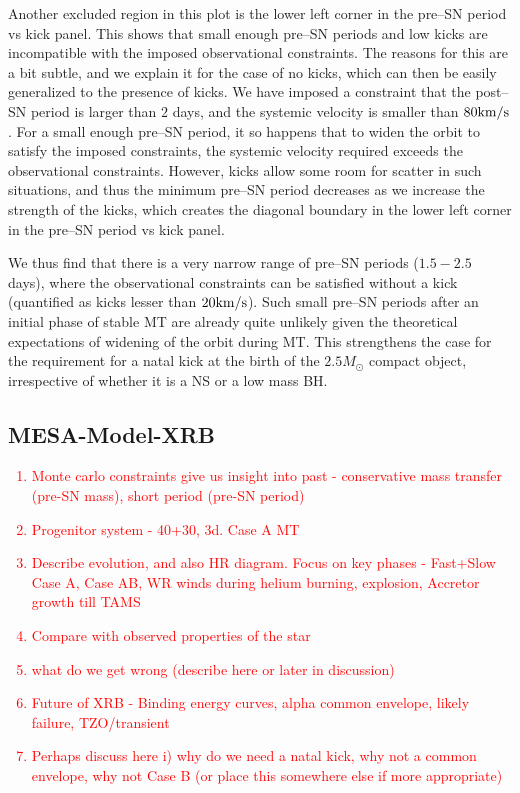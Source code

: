 \documentclass[linenumbers,trackchanges,twocolumn]{aastex701}
\newcommand{\red}{\textcolor{red}}
\begin{document}
Another excluded region in this plot is the lower left corner in the pre--SN period vs kick panel. This shows that small enough pre--SN periods and low kicks are incompatible with the imposed observational constraints. The reasons for this are a bit subtle, and we explain it for the case of no kicks, which can then be easily generalized to the presence of kicks. We have imposed a constraint that the post--SN period is larger than $2$ days, and the systemic velocity is smaller than $80\rm km/s$. For a small enough pre--SN period, it so happens that to widen the orbit to satisfy the imposed constraints, the systemic velocity required exceeds the observational constraints. However, kicks allow some room for scatter in such situations, and thus the minimum pre--SN period decreases as we increase the strength of the kicks, which creates the diagonal boundary in the lower left corner in the pre--SN period vs kick panel.

We thus find that there is a very narrow range of pre--SN periods ($1.5-2.5$ days), where the observational constraints can be satisfied without a kick (quantified as kicks lesser than $20 \rm km/s$). Such small pre--SN periods after an initial phase of stable MT are already quite unlikely given the theoretical expectations of widening of the orbit during MT. This strengthens the case for the requirement for a natal kick at the birth of the $2.5 M_{\odot}$ compact object, irrespective of whether it is a NS or a low mass BH. 

\subsection{MESA-Model-XRB}

\red{
\begin{enumerate}
    \item Monte carlo constraints give us insight into past - conservative mass transfer (pre-SN mass), short period (pre-SN period)
    \item Progenitor system - 40+30, 3d. Case A MT
    \item Describe evolution, and also HR diagram. Focus on key phases - Fast+Slow Case A, Case AB, WR winds during helium burning, explosion, Accretor growth till TAMS
    \item Compare with observed properties of the star
    \item what do we get wrong (describe here or later in discussion)
    \item Future of XRB - Binding energy curves, alpha common envelope, likely failure, TZO/transient
    \item Perhaps discuss here i) why do we need a natal kick, why not a common envelope, why not Case B (or place this somewhere else if more appropriate)
\end{enumerate}
}
\end{document}
